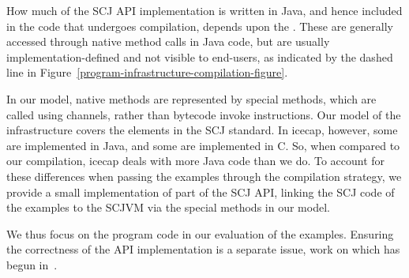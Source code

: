 How much of the SCJ API implementation is written in Java, and hence
included in the code that undergoes compilation, depends upon the
.
These are generally accessed through native method calls in Java code,
but are usually implementation-defined and not visible to end-users,
as indicated by the dashed line in
Figure~\ref{program-infrastructure-compilation-figure}.

In our model, native methods are represented by special methods, which
are called using channels, rather than bytecode invoke instructions.
Our model of the infrastructure covers the elements in the SCJ
standard. 
In icecap, however, some are implemented in Java, and some are
implemented in C. 
So, when compared to our compilation, icecap deals with more Java code
than we do.
To account for these differences when passing the examples through the
compilation strategy, we provide a small implementation of part of the
SCJ API, linking the SCJ code of the examples to the SCJVM via the
special methods in our model.

We thus focus on the program code in
our evaluation of the examples.
Ensuring the correctness of the API implementation is a separate
issue, work on which has begun in~\cite{freitas2016}.

